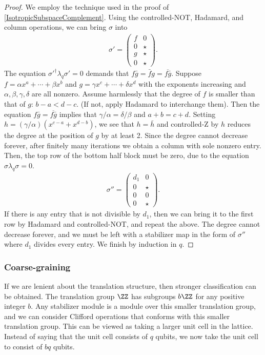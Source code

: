 \begin{proof}
We employ the technique used in the proof of \ref{IsotropicSubspaceComplement}.
Using the controlled-NOT, Hadamard, and column operations,
we can bring $\sigma$ into
\begin{align}
\sigma' =
 \begin{pmatrix}
  f & 0 \\
  0 & \star \\
  g & \star \\
  0 & \star
 \end{pmatrix}.
\end{align}
The equation $\sigma'^\dagger \lambda_q \sigma' = 0$ demands that $f \bar g = \bar f g = \overline{f \bar g}$.
Suppose $f = \alpha x^a + \cdots + \beta x^b$ and $g = \gamma x^c + \cdots + \delta x^d$ with the exponents increasing
and $\alpha,\beta,\gamma,\delta$ are all nonzero.
Assume harmlessly that the degree of $f$ is smaller than that of $g$: $b-a < d-c$.
(If not, apply Hadamard to interchange them).
Then the equation $f \bar g = \overline{f \bar g}$ 
implies that $\gamma/\alpha = \delta / \beta$ and $a+b = c+d$.
Setting $h = (\gamma/\alpha)(x^{c-a} + x^{d-b})$, we see that $h = \bar h$
and controlled-Z by $h$ reduces the degree at the position of $g$ by at least 2.
Since the degree cannot decrease forever, 
after finitely many iterations
we obtain a column with sole nonzero entry.
Then, the top row of the bottom half block must be zero, 
due to the equation $\sigma \lambda_q \sigma = 0$.
\begin{align}
\sigma'' =
 \begin{pmatrix}
  d_1 & 0 \\
  0 & \star \\
  0 & 0 \\
  0 & \star
 \end{pmatrix}.
\end{align}
If there is any entry that is not divisible by $d_1$, then we can bring it to the first row by Hadamard and controlled-NOT,
and repeat the above.
The degree cannot decrease forever, and we must be left with a stabilizer map in the form of $\sigma''$
where $d_1$ divides every entry.
We finish by induction in $q$.
\end{proof}


\subsubsection{Coarse-graining}

If we are lenient about the translation structure,
then stronger classification can be obtained.
The translation group $\ZZ$ has subgroups $b\ZZ$ for any positive integer $b$.
Any stabilizer module is a module over this smaller translation group,
and we can consider Clifford operations that conforms
with this smaller translation group.
This can be viewed as taking a larger unit cell in the lattice.
Instead of saying that the unit cell consists of $q$ qubits,
we now take the unit cell to consist of $bq$ qubits.

